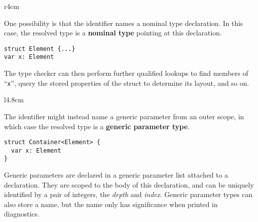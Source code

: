 \documentclass[../generics]{subfiles}
\begin{document}
\begin{wrapfigure}[6]{r}{4cm}
\end{wrapfigure}

\medskip

One possibility is that the identifier names a nominal type declaration. In this case, the resolved type is a \textbf{nominal type} pointing at this declaration.

\medskip
\noindent
\begin{minipage}{26.5em}
\begin{Verbatim}
struct Element {...}
var x: Element
\end{Verbatim}
\end{minipage}
\medskip

The type checker can then perform further qualified lookups to find members of ``\texttt{x}'', query the stored properties of the struct to determine its layout, and so on.

\begin{wrapfigure}[4]{l}{4.8cm}
\end{wrapfigure}

\medskip

The identifier might instead name a generic parameter from an outer scope, in which case the resolved type is a \textbf{generic parameter type}.

\medskip

\noindent
\begin{minipage}{24.5em}
\begin{Verbatim}
struct Container<Element> {
  var x: Element
}
\end{Verbatim}
\end{minipage}
\medskip

Generic parameters are declared in a generic parameter list attached to a declaration. They are scoped to the body of this declaration, and can be uniquely identified by a pair of integers, the \emph{depth} and \emph{index}. Generic parameter types can also store a name, but the name only has significance when printed in diagnostics.
\end{document}
